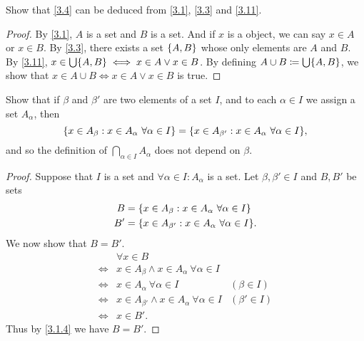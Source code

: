 \begin{ex}\label{ex:3.4.8}
	Show that \cref{3.4} can be deduced from \cref{3.1}, \cref{3.3} and \cref{3.11}.
\end{ex}

\begin{proof}
	By \cref{3.1}, \(A\) is a set and \(B\) is a set.
	And if \(x\) is a object, we can say \(x \in A\) or \(x \in B\).
	By \cref{3.3}, there exists a set \(\left\lbrace A, B\right\rbrace\) whose only elements are \(A\) and \(B\).
	By \cref{3.11}, \(x \in \bigcup \set{A, B} \iff x \in A \lor x \in B\).
	By defining \(A \cup B \coloneqq \bigcup \set{A, B}\), we show that \(x \in A \cup B \iff x \in A \lor x \in B\) is true.
\end{proof}

\begin{ex}\label{ex:3.4.9}
	Show that if \(\beta\) and \(\beta'\) are two elements of a set \(I\), and to each \(\alpha \in I\) we assign a set \(A_{\alpha}\), then
	\[
		\set{x \in A_{\beta} : x \in A_{\alpha} \ \forall \alpha \in I} = \set{x \in A_{\beta'} : x \in A_{\alpha} \ \forall \alpha \in I},
	\]
	and so the definition of \(\bigcap_{\alpha \in I} A_{\alpha}\) does not depend on \(\beta\).
\end{ex}

\begin{proof}
	Suppose that \(I\) is a set and \(\forall \alpha \in I : A_{\alpha}\) is a set.
	Let \(\beta, \beta' \in I\) and \(B, B'\) be sets
	\begin{align*}
		B  & = \set{x \in A_{\beta} : x \in A_{\alpha} \ \forall \alpha \in I}   \\
		B' & = \set{x \in A_{\beta'} : x \in A_{\alpha} \ \forall \alpha \in I}.
	\end{align*}
	We now show that \(B = B'\).
	\begin{align*}
		     & \forall x \in B                                                                 \\
		\iff & x \in A_{\beta} \land x \in A_{\alpha} \ \forall \alpha \in I                   \\
		\iff & x \in A_{\alpha} \ \forall \alpha \in I                        & (\beta \in I)  \\
		\iff & x \in A_{\beta'} \land x \in A_{\alpha} \ \forall \alpha \in I & (\beta' \in I) \\
		\iff & x \in B'.
	\end{align*}
	Thus by \cref{3.1.4} we have \(B = B'\).
\end{proof}

